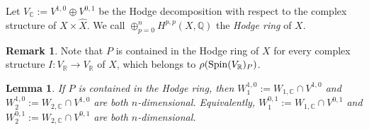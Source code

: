 \documentclass[12pt]{amsart}
\numberwithin{equation}{subsection}
\theoremstyle{plain}
\newtheorem{lem}[thm]{Lemma}
\theoremstyle{definition}
\newtheorem{rem}[thm]{Remark}
\newcommand{\CC}{{\mathbb C}}
\newcommand{\QQ}{{\mathbb Q}}
\newcommand{\RR}{{\mathbb R}}
\newcommand{\Spin}{{\rm Spin}}
\begin{document}
Let  $V_\CC:=V^{1,0}\oplus V^{0,1}$ be the Hodge decomposition with respect to the complex structure of $X\times \hat{X}$. We call $\oplus_{p=0}^n H^{p,p}(X,\QQ)$ the {\em Hodge ring} of $X$. 

\begin{rem}
\label{remark-P-is-contained-in-the-Hodge-ring-if-I-is-in-image-of-Spin-V-P}
Note that $P$ is contained in the Hodge ring of $X$ for every complex structure $I:V_\RR\rightarrow V_\RR$ of $X$, which 
belongs to $\rho(\Spin(V_\RR)_P)$.
\end{rem}


\begin{lem}
\label{lemma-decomposition-into-4-direct-summands}
If $P$ is contained in the Hodge ring, then 
$W_1^{1,0}:=W_{1,\CC}\cap V^{1,0}$ and $W_2^{1,0}:=W_{2,\CC}\cap V^{1,0}$  are both  $n$-dimensional. Equivalently,
$W_1^{0,1}:=W_{1,\CC}\cap V^{0,1}$ and $W_2^{0,1}:=W_{2,\CC}\cap V^{0,1}$  are both  $n$-dimensional. 
\end{lem}
\end{document}
